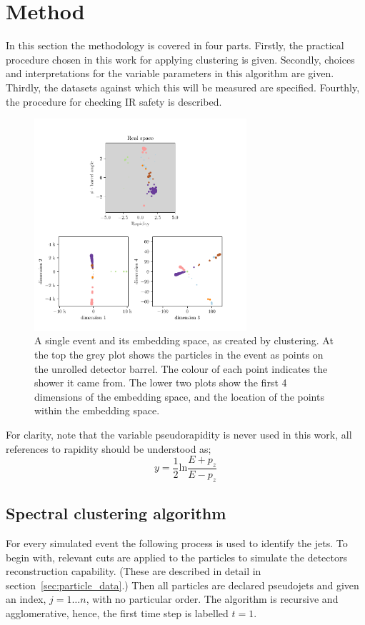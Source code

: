 \section{Method}
In this section the methodology is covered in four parts.
Firstly, the practical procedure chosen in this work for applying \spectral{} clustering  is given.
Secondly, choices and interpretations for the variable parameters in this algorithm are given.
Thirdly,  the datasets against which this will be measured are specified.
Fourthly, the procedure for checking IR safety is described.

    \begin{figure}[!t]
        \center
        \includegraphics[width=0.7\textwidth]{graphics/embedding_space_simple2.pdf}
        \caption{A single event and its embedding space, as created by \spectral{} clustering.
            At the top the grey plot shows the particles in the event as points on the unrolled detector barrel.
            The colour of each point indicates the shower it came from.
            The lower two plots show the first 4 dimensions of the embedding space,
            and the location of the points within the embedding space.}\label{fig:embedding_space_simple}
    \end{figure}    


For clarity, note that the variable pseudorapidity is never used in this work,
all references to rapidity should be understood as;
\begin{equation}\label{eqn:rapidity}
    y = \frac{1}{2} \text{ln}\frac{E + p_z}{E - p_z}
\end{equation}


\subsection{Spectral clustering algorithm}\label{sec:spectralmethodalgo}
    For every simulated event the following process is used to identify the jets.
    To begin with, relevant cuts are applied to the particles to simulate the detectors reconstruction capability.
    (These are described in detail in section~\ref{sec:particle_data}.)
    Then all particles are declared pseudojets  and given an index, \(j = 1 \dots n\), with no particular order.
    The algorithm is recursive and agglomerative, hence, the first time 
     step is labelled \(t=1\).

